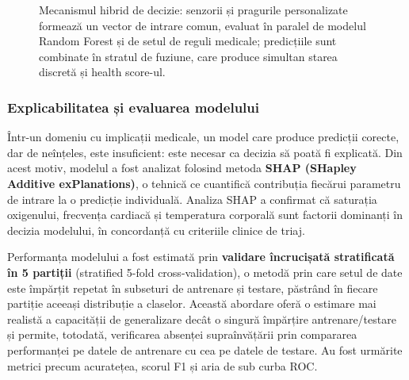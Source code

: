 \documentclass[12pt,a4paper,twoside]{article}
\begin{document}
\begin{figure}[H]
{}
\caption{Mecanismul hibrid de decizie: senzorii și pragurile personalizate formează un vector de intrare comun, evaluat în paralel de modelul Random Forest și de setul de reguli medicale; predicțiile sunt combinate în stratul de fuziune, care produce simultan starea discretă și health score-ul.}
\label{fig:hibrid-ai}
\end{figure}

\subsubsection{Explicabilitatea și evaluarea modelului}

Într-un domeniu cu implicații medicale, un model care produce predicții corecte, dar de neînțeles, este insuficient: este necesar ca decizia să poată fi explicată. Din acest motiv, modelul a fost analizat folosind metoda \textbf{SHAP (SHapley Additive exPlanations)}, o tehnică ce cuantifică contribuția fiecărui parametru de intrare la o predicție individuală. Analiza SHAP a confirmat că saturația oxigenului, frecvența cardiacă și temperatura corporală sunt factorii dominanți în decizia modelului, în concordanță cu criteriile clinice de triaj.

Performanța modelului a fost estimată prin \textbf{validare încrucișată stratificată în 5 partiții} (stratified 5-fold cross-validation), o metodă prin care setul de date este împărțit repetat în subseturi de antrenare și testare, păstrând în fiecare partiție aceeași distribuție a claselor. Această abordare oferă o estimare mai realistă a capacității de generalizare decât o singură împărțire antrenare/testare și permite, totodată, verificarea absenței supraînvățării prin compararea performanței pe datele de antrenare cu cea pe datele de testare. Au fost urmărite metrici precum acuratețea, scorul F1 și aria de sub curba ROC.
\end{document}
